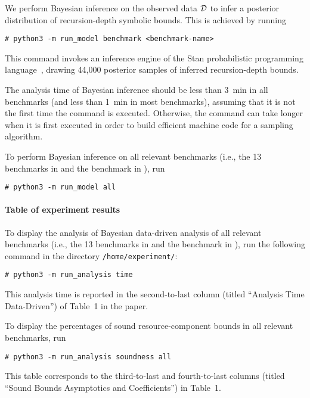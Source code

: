 We perform Bayesian inference on the observed data $\mathcal{D}$ to infer a posterior
distribution of recursion-depth symbolic bounds.
%
This is achieved by running
\begin{verbatim}
# python3 -m run_model benchmark <benchmark-name>
\end{verbatim}
%
This command invokes an inference engine of the Stan probabilistic programming
language~\citep{Carpenter2017}, drawing 44,000 posterior samples of inferred
recursion-depth bounds.

The analysis time of Bayesian inference should be less than \qty{3}{\minute} in
all benchmarks (and less than \qty{1}{\minute} in most benchmarks), assuming
that it is not the first time the command is executed.
%
Otherwise, the command can take longer when it is first executed in order to
build efficient machine code for a sampling algorithm.

To perform Bayesian inference on all relevant benchmarks (i.e., the 13
benchmarks in  and the benchmark
\quicksorttiml{} in ), run
\begin{verbatim}
# python3 -m run_model all
\end{verbatim}

\paragraph{Table of experiment results}

To display the analysis of Bayesian data-driven analysis of all relevant
benchmarks (i.e., the 13 benchmarks in 
and the benchmark \quicksorttiml{} in ),
run the following command in the directory \texttt{/home/experiment/}:
\begin{verbatim}
# python3 -m run_analysis time
\end{verbatim}
%
This analysis time is reported in the second-to-last column (titled ``Analysis
Time Data-Driven'') of Table~1 in the paper.

To display the percentages of sound resource-component bounds in all relevant
benchmarks, run
\begin{verbatim}
# python3 -m run_analysis soundness all
\end{verbatim}
%
This table corresponds to the third-to-last and fourth-to-last columns (titled
``Sound Bounds Asymptotics and Coefficients'') in Table~1.


